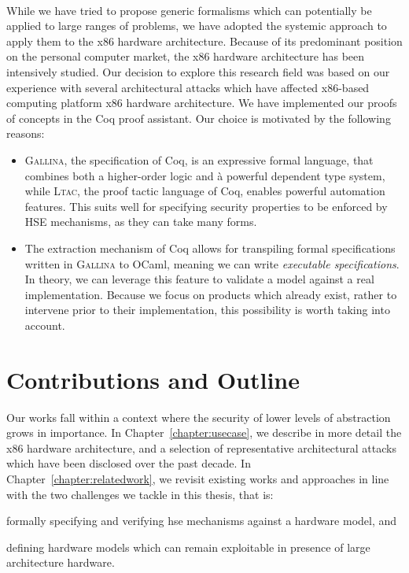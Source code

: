 \paragraph{}
%
While we have tried to propose generic formalisms which can potentially be
applied to large ranges of problems, we have adopted the systemic approach to
apply them to the x86 hardware architecture.
%
Because of its predominant position on the personal computer market, the x86
hardware architecture has been intensively studied.
%
Our decision to explore this research field was based on our experience with
several architectural attacks which have affected x86-based computing platform
x86 hardware architecture.
%
We have implemented our proofs of concepts in the Coq proof assistant.
%
Our choice is motivated by the following reasons:
%
\begin{itemize}
\item {\scshape Gallina}, the specification of Coq, is an expressive formal language,
  that combines both a higher-order logic and à powerful dependent type system,
  while {\scshape Ltac}, the proof tactic language of Coq, enables powerful
  automation features.
  This suits well for specifying security properties to be enforced by HSE
  mechanisms, as they can take many forms.
\item The extraction mechanism of Coq allows for transpiling formal
  specifications written in {\scshape Gallina} to OCaml, meaning we can write
  \emph{executable specifications}.
  In theory, we can leverage this feature to validate a model against a real
  implementation.
  Because we focus on products which already exist, rather to intervene prior to
  their implementation, this possibility is worth taking into account.
\end{itemize}

\section{Contributions and Outline}

Our works fall within a context where the security of lower levels of
abstraction  grows in importance.
%
In Chapter~\ref{chapter:usecase}, we describe in more detail the x86 hardware
architecture, and a selection of representative architectural attacks which have
been disclosed over the past decade.
%
In Chapter~\ref{chapter:relatedwork}, we revisit existing works and approaches
in line with the two challenges we tackle in this thesis, that is:
%
\begin{inparaenum}[(1)]
\item formally specifying and verifying \ac{hse} mechanisms against a hardware
  model, and
%
\item defining hardware models which can remain exploitable in presence of large
  architecture hardware. 
\end{inparaenum}

